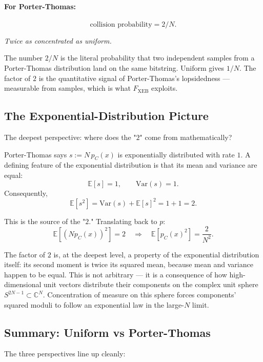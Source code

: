 \documentclass[11pt]{article}
\theoremstyle{plain}
\theoremstyle{definition}
\newcommand{\Fxeb}{F_{\text{XEB}}}
\newcommand{\E}{\mathbb{E}}
\newcommand{\Var}{\mathrm{Var}}
\begin{document}
\paragraph{For Porter-Thomas:}
\[
\text{collision probability} = 2/N.
\]

\emph{Twice as concentrated as uniform.}

\begin{intuition}
The number $2/N$ is the literal probability that two independent samples from a Porter-Thomas distribution land on the same bitstring. Uniform gives $1/N$. The factor of $2$ is the quantitative signal of Porter-Thomas's lopsidedness --- measurable from samples, which is what $\Fxeb$ exploits.
\end{intuition}

\subsection{The Exponential-Distribution Picture}

The deepest perspective: where does the "$2$" come from mathematically?

Porter-Thomas says $s := N\, p_C(x)$ is exponentially distributed with rate $1$. A defining feature of the exponential distribution is that its mean and variance are equal:
\[
\E[s] = 1, \qquad \Var(s) = 1.
\]
Consequently,
\[
\E[s^2] = \Var(s) + \E[s]^2 = 1 + 1 = 2.
\]

This is the source of the "$2$." Translating back to $p$:
\[
\E[(Np_C(x))^2] = 2 \quad \Longrightarrow \quad \E[p_C(x)^2] = \frac{2}{N^2}.
\]

\begin{intuition}
The factor of $2$ is, at the deepest level, a property of the exponential distribution itself: its second moment is twice its squared mean, because mean and variance happen to be equal. This is not arbitrary --- it is a consequence of how high-dimensional unit vectors distribute their components on the complex unit sphere $S^{2N-1} \subset \mathbb{C}^N$. Concentration of measure on this sphere forces components' squared moduli to follow an exponential law in the large-$N$ limit.
\end{intuition}

\subsection{Summary: Uniform vs Porter-Thomas}

The three perspectives line up cleanly:
\end{document}
